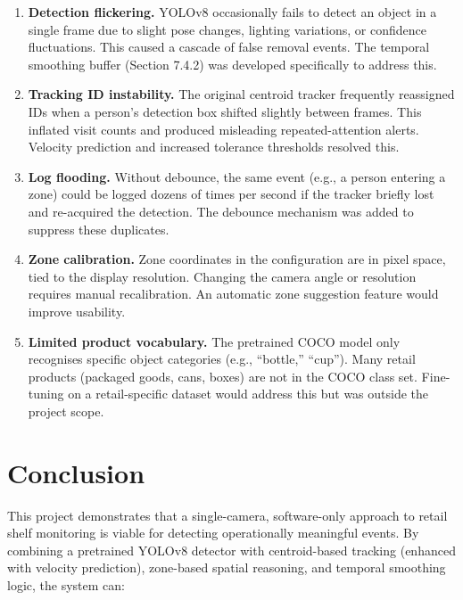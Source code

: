 \documentclass[12pt,a4paper]{article}
\begin{document}
\begin{enumerate}
    \item \textbf{Detection flickering.} YOLOv8 occasionally fails to detect an object in a single frame due to slight pose changes, lighting variations, or confidence fluctuations. This caused a cascade of false removal events. The temporal smoothing buffer (Section 7.4.2) was developed specifically to address this.

    \item \textbf{Tracking ID instability.} The original centroid tracker frequently reassigned IDs when a person's detection box shifted slightly between frames. This inflated visit counts and produced misleading repeated-attention alerts. Velocity prediction and increased tolerance thresholds resolved this.

    \item \textbf{Log flooding.} Without debounce, the same event (e.g., a person entering a zone) could be logged dozens of times per second if the tracker briefly lost and re-acquired the detection. The debounce mechanism was added to suppress these duplicates.

    \item \textbf{Zone calibration.} Zone coordinates in the configuration are in pixel space, tied to the display resolution. Changing the camera angle or resolution requires manual recalibration. An automatic zone suggestion feature would improve usability.

    \item \textbf{Limited product vocabulary.} The pretrained COCO model only recognises specific object categories (e.g., ``bottle,'' ``cup''). Many retail products (packaged goods, cans, boxes) are not in the COCO class set. Fine-tuning on a retail-specific dataset would address this but was outside the project scope.
\end{enumerate}

\section{Conclusion}

This project demonstrates that a single-camera, software-only approach to retail shelf monitoring is viable for detecting operationally meaningful events.
By combining a pretrained YOLOv8 detector with centroid-based tracking (enhanced with velocity prediction), zone-based spatial reasoning, and temporal smoothing logic, the system can:
\end{document}
